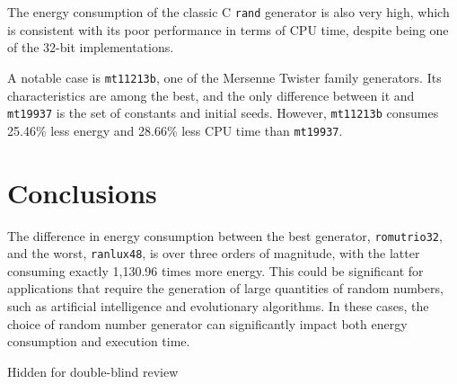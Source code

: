 \documentclass[sigconf]{acmart}
\begin{document}
The energy consumption of the classic C \texttt{rand} generator is also very high, which is consistent with its poor performance in terms of CPU time, despite being one of the 32-bit implementations.

A notable case is \texttt{mt11213b}, one of the Mersenne Twister family generators. Its characteristics are among the best, and the only difference between it and \texttt{mt19937} is the set of constants and initial seeds. However, \texttt{mt11213b} consumes 25.46\% less energy and 28.66\% less CPU time than \texttt{mt19937}.


\section{Conclusions}
\label{sec:conclusions}

The difference in energy consumption between the best generator, \texttt{romutrio32}, and the worst, \texttt{ranlux48}, is over three orders of magnitude, with the latter consuming exactly 1,130.96 times more energy. This could be significant for applications that require the generation of large quantities of random numbers, such as artificial intelligence and evolutionary algorithms. In these cases, the choice of random number generator can significantly impact both energy consumption and execution time.

\begin{acks}
Hidden for double-blind review
\end{acks}



\end{document}
